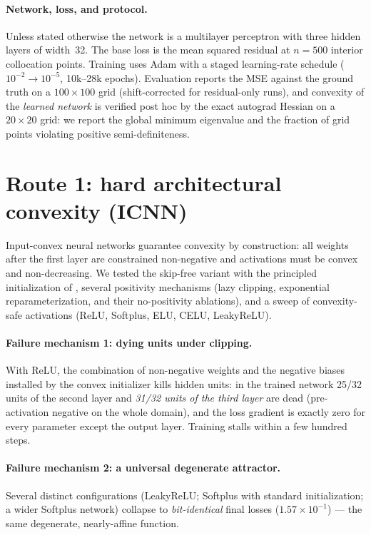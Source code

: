 \documentclass[11pt,a4paper]{article}
\begin{document}
\paragraph{Network, loss, and protocol.} Unless stated otherwise the
network is a multilayer perceptron with three hidden layers of width~32.
The base loss is the mean squared residual at $n=500$ interior collocation
points. Training uses Adam with a staged learning-rate schedule
($10^{-2}\!\to\!10^{-5}$, 10k--28k epochs). Evaluation reports the MSE
against the ground truth on a $100\times100$ grid (shift-corrected for
residual-only runs), and convexity of the \emph{learned network} is verified
post hoc by the exact autograd Hessian on a $20\times20$ grid: we report the
global minimum eigenvalue and the fraction of grid points violating positive
semi-definiteness.

\section{Route 1: hard architectural convexity (ICNN)}\label{sec:icnn}

Input-convex neural networks \cite{amos2017input} guarantee convexity by
construction: all weights after the first layer are constrained non-negative
and activations must be convex and non-decreasing. We tested the skip-free
variant with the principled initialization of \cite{hoedt2023principled},
several positivity mechanisms (lazy clipping, exponential reparameterization,
and their no-positivity ablations), and a sweep of convexity-safe activations
(ReLU, Softplus, ELU, CELU, LeakyReLU).

\paragraph{Failure mechanism 1: dying units under clipping.} With ReLU, the
combination of non-negative weights and the negative biases installed by the
convex initializer kills hidden units: in the trained network 25/32 units of
the second layer and \emph{31/32 units of the third layer} are dead
(pre-activation negative on the whole domain), and the loss gradient is
exactly zero for every parameter except the output layer. Training stalls
within a few hundred steps.

\paragraph{Failure mechanism 2: a universal degenerate attractor.} Several
distinct configurations (LeakyReLU; Softplus with standard initialization;
a wider Softplus network) collapse to \emph{bit-identical} final losses
($1.57\times10^{-1}$) --- the same degenerate, nearly-affine function.
\end{document}
